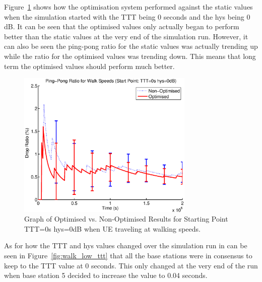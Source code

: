 Figure~\ref{fig:walk_low_ping} shows how the optimisation system performed against the static values when the simulation started with the TTT being 0 seconds and the hys being 0 dB. It can be seen that the optimised values only actually began to perform better than the static values at the very end of the simulation run. However, it can also be seen the ping-pong ratio for the static values was actually trending up while the ratio for the optimised values was trending down. This means that long term the optimised values should perform much better. 
\begin{figure}[H]
  \begin{center}
    	  \includegraphics[width=0.75\textwidth]{figures/walking_figures/walklow.eps}
    \end{center}
    \caption{Graph of Optimised vs. Non-Optimised Results for Starting Point TTT=0s hys=0dB when UE traveling at walking speeds.}
    \label{fig:walk_low_ping}
\end{figure}
As for how the TTT and hys values changed over the simulation run in can be seen in Figure~\ref{fig:walk_low_ttt} that all the base stations were in consensus to keep to the TTT value at 0 seconds. This only changed at the very end of the run when base station 5 decided to increase the value to 0.04 seconds.


